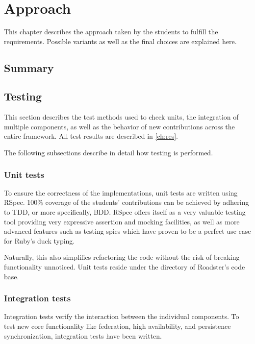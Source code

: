 \chapter{Approach}
This chapter describes the approach taken by the students to fulfill the
requirements. Possible variants as well as the final choices are explained here.

\section{Summary}

\section{Testing}
This section describes the test methods used to check units, the integration of
multiple components, as well as the behavior of new contributions across the
entire framework.  All test results are described in \autoref{ch:res}.

The following subsections describe in detail how testing is performed.

\subsection{Unit tests}
To ensure the correctness of the implementations, unit tests are written using
RSpec. 100\% coverage of the students' contributions can be achieved by
adhering to \gls{TDD}, or more specifically, \gls{BDD}. RSpec offers itself as
a very valuable testing tool providing very expressive assertion and mocking
facilities, as well as more advanced features such as testing spies which have
proven to be a perfect use case for Ruby's duck typing.

Naturally, this also simplifies refactoring the code without the risk of
breaking functionality unnoticed. Unit tests reside under the 
directory of Roadster's code base.

\subsection{Integration tests}
Integration tests verify the interaction between the individual components.
To test new core functionality like federation, high availability, and persistence
synchronization, integration tests have been written.

